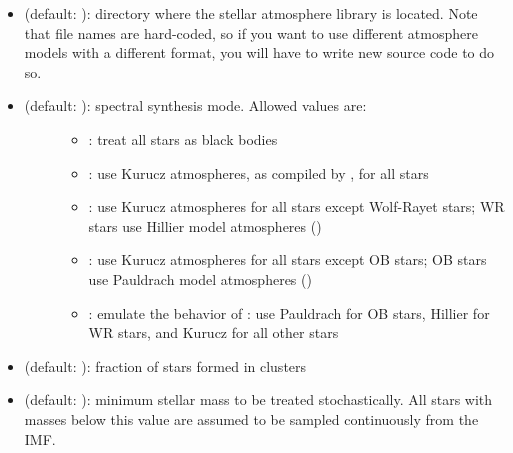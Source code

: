 \documentclass[letterpaper,10pt,english]{sphinxmanual}
\begin{document}
\begin{itemize}
\item {} 
 (default: ): directory where the stellar atmosphere library is located. Note that file names are hard-coded, so if you want to use different atmosphere models with a different format, you will have to write new source code to do so.

\item {} \begin{description}
\item[{ (default: ): spectral synthesis mode. Allowed values are:}] \leavevmode\begin{itemize}
\item {} 
: treat all stars as black bodies

\item {} 
: use Kurucz atmospheres, as compiled by , for all stars

\item {} 
: use Kurucz atmospheres for all stars except Wolf-Rayet stars; WR stars use Hillier model atmospheres ()

\item {} 
: use Kurucz atmospheres for all stars except OB stars; OB stars use Pauldrach model atmospheres ()

\item {} 
: emulate the behavior of : use Pauldrach for OB stars, Hillier for WR stars, and Kurucz for all other stars

\end{itemize}

\end{description}

\item {} 
 (default: ): fraction of stars formed in clusters

\item {} 
 (default: ): minimum stellar mass to be treated stochastically. All stars with masses below this value are assumed to be sampled continuously from the IMF.


\end{itemize}
\end{document}
